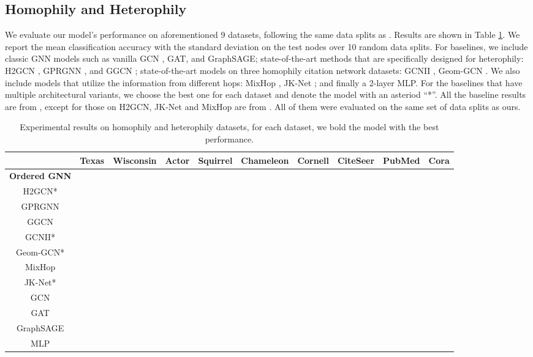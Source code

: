 \documentclass{article}
\begin{document}
\subsection{Homophily and Heterophily}
\label{setting_homo_hete}
We evaluate our model's performance on aforementioned 9 datasets, following the same data splits as \citet{pei2020geom}. Results are shown in Table \ref{table.results.hete_homo}. We report the mean classification accuracy with the standard deviation on the test nodes over 10 random data splits. For baselines, we include classic GNN models such as vanilla GCN \citep{kipf2016semi}, GAT\citep{velivckovic2017graph}, and GraphSAGE\citep{hamilton2017inductive}; state-of-the-art methods that are specifically designed for heterophily: H2GCN \citep{zhu2020beyond}, GPRGNN \citep{chien2020adaptive}, and GGCN \citep{yan2021two}; state-of-the-art models on three homophily citation network datasets: GCNII \citep{chen2020simple}, Geom-GCN \citep{pei2020geom}. We also include models that utilize the information from different hops: MixHop \citep{abu2019mixhop}, JK-Net \citep{xu2018representation}; and finally a 2-layer MLP. For the baselines that have multiple architectural variants, we choose the best one for each dataset and denote the model with an asteriod ``*''. All the baseline results are from \citet{yan2021two}, except for those on H2GCN, JK-Net and MixHop are from \citet{zhu2020beyond}. All of them were evaluated on the same set of data splits as ours.

\begin{table}\caption{Experimental results on homophily and heterophily datasets, for each dataset, we bold the model with the best performance.}
\label{table.results.hete_homo}
\centering
\resizebox{\textwidth}{!}
{
\begin{tabular}{c|cccccc|ccc}
\toprule
& Texas & Wisconsin & Actor & Squirrel & Chameleon & Cornell & CiteSeer & PubMed & Cora \\
\midrule
\textbf{Ordered GNN} &  &  &  &  &  &  &  &  &  \\
\midrule
H2GCN* &  &  &  &  &  &  &   &  &  \\
GPRGNN &  &  &  &  &  &  &   &  &  \\
GGCN &  &  &
 &  &  &  &   &  &  \\
\midrule
GCNII* &  &  &  &  &  &  &  &
 &
 \\
Geom-GCN* &  &  &  &  &  &  &   &  &  \\
\midrule
MixHop &  &  &  &  &  &  &  &  &  \\ 
JK-Net* &  &  &  &  &  &  &  &  &  \\
\midrule
GCN &  &  &   &  &  &
 &   &  &  \\
GAT &  &  &  &  &  &  &   &  &  \\
GraphSAGE &  &  &  &  &  &  &   &  &  \\
\midrule
MLP &  &  &  &  &  &  &   &  &  \\
\bottomrule
\end{tabular}
}
\end{table}
\end{document}
